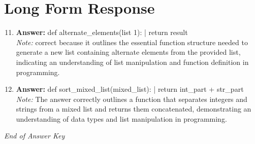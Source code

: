 \documentclass[12pt]{article}
\begin{document}
\section*{Long Form Response}
\begin{enumerate}[label=\arabic*.]
\setcounter{enumi}{10}
\item \textbf{Answer:} def alternate\_elements(list 1): | return result
\\ \textit{Note:} correct because it outlines the essential function structure needed to generate a new list containing alternate elements from the provided list, indicating an understanding of list manipulation and function definition in programming.
\item \textbf{Answer:} def sort\_mixed\_list(mixed\_list): | return int\_part + str\_part
\\ \textit{Note:} The answer correctly outlines a function that separates integers and strings from a mixed list and returns them concatenated, demonstrating an understanding of data types and list manipulation in programming.
\end{enumerate}

\vfill
\noindent\textit{End of Answer Key}
\end{document}
